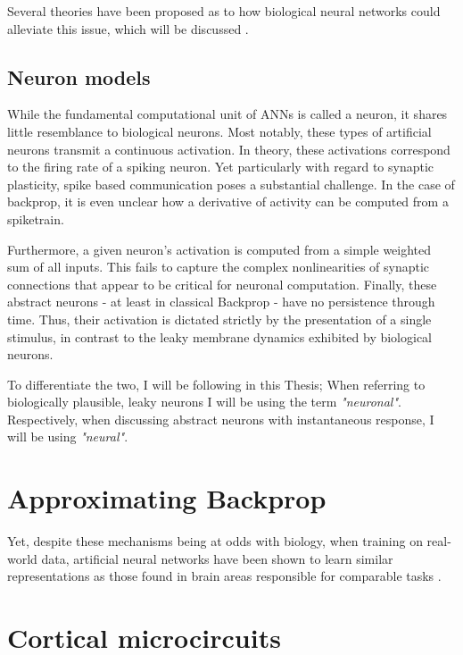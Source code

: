 Several theories have been proposed as to how biological neural networks could alleviate this issue, which will be
discussed .

\subsection*{Neuron models}

While the fundamental computational unit of ANNs is called a neuron, it shares little resemblance to biological neurons.
Most notably, these types of artificial neurons transmit a continuous activation. In theory, these activations correspond
to the firing rate of a spiking neuron. Yet particularly with regard to synaptic plasticity, spike based communication
poses a substantial challenge. In the case of backprop, it is even unclear how a derivative of activity can be computed
from a spiketrain.

Furthermore, a given neuron's activation is computed from a simple weighted sum of all inputs. This fails to capture the
complex nonlinearities of synaptic connections that appear to be critical for neuronal computation. Finally, these
abstract neurons - at least in classical Backprop - have no persistence through time. Thus, their activation is dictated
strictly by the presentation of a single stimulus, in contrast to the leaky membrane dynamics exhibited by biological
neurons.

To differentiate the two, I will be following \cite{Haider2021} in this Thesis; When referring to biologically
plausible, leaky neurons I will be using the term \textit{"neuronal"}. Respectively, when discussing abstract neurons with
instantaneous response, I will be using \textit{"neural"}.







\section{Approximating Backprop}


Yet, despite these mechanisms being at odds with biology, when training on real-world data, artificial neural networks
have been shown to learn similar representations as those found in brain areas responsible for comparable tasks
\cite{whittington2019theories,Yamins2016}.



\section{Cortical microcircuits}
